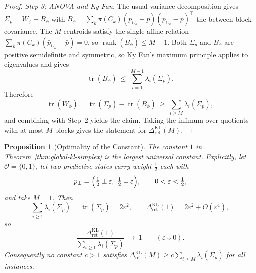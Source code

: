 \documentclass[12pt]{article}
\newtheorem{proposition}[theorem]{Proposition}
\theoremstyle{definition}
\DeclareMathOperator{\rank}{rank}
\DeclareMathOperator{\tr}{tr}
\newcommand{\RetKL}{\Delta_{\mathrm{ret}}^{\mathrm{KL}}}
\begin{document}
\begin{proof}
\emph{Step 3: ANOVA and Ky Fan.}
The usual variance decomposition gives $\Sigma_p=W_\phi+B_\phi$ with
$B_\phi=\sum_k\pi(C_k)(\bar p_{C_k}-\bar p)(\bar p_{C_k}-\bar p)^{\!\top}$ the
between-block covariance.  The $M$ centroids satisfy the single affine relation
$\sum_k\pi(C_k)(\bar p_{C_k}-\bar p)=0$, so $\rank(B_\phi)\le M-1$.  Both
$\Sigma_p$ and $B_\phi$ are positive semidefinite and symmetric, so Ky Fan's
maximum principle \cite{kyfan1951} applies to eigenvalues and gives
\[
\tr(B_\phi)\ \le\ \sum_{i=1}^{M-1}\lambda_i(\Sigma_p).
\]
Therefore
\[
\tr(W_\phi)=\tr(\Sigma_p)-\tr(B_\phi)\ \ge\ \sum_{i\ge M}\lambda_i(\Sigma_p),
\]
and combining with Step~2 yields the claim.  Taking the infimum over quotients
with at most $M$ blocks gives the statement for $\RetKL(M)$.
\end{proof}

\begin{proposition}[Optimality of the Constant]
\label{prop:kl-simplex-sharp}
The constant $1$ in Theorem~\ref{thm:global-kl-simplex} is the largest
universal constant.  Explicitly, let $\mathcal O=\{0,1\}$, let two predictive
states carry weight $\tfrac12$ each with
\[
p_\pm=\Bigl(\tfrac12\pm\varepsilon,\ \tfrac12\mp\varepsilon\Bigr),
\qquad
0<\varepsilon<\tfrac12,
\]
and take $M=1$.  Then
\[
\sum_{i\ge1}\lambda_i(\Sigma_p)=\tr(\Sigma_p)=2\varepsilon^2,
\qquad
\RetKL(1)=2\varepsilon^2+O(\varepsilon^4),
\]
so
\[
\frac{\RetKL(1)}{\sum_{i\ge1}\lambda_i(\Sigma_p)}
\ \longrightarrow\ 1
\qquad(\varepsilon\downarrow0).
\]
Consequently no constant $c>1$ satisfies
$\RetKL(M)\ge c\sum_{i\ge M}\lambda_i(\Sigma_p)$ for all instances.
\end{proposition}
\end{document}
